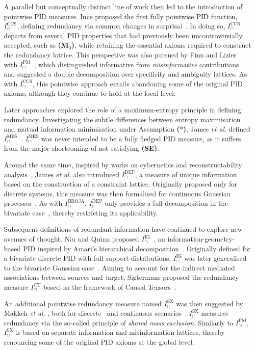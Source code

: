 \documentclass{article}
\makeatletter
\newcommand{\etal}{\textit{et al.\@} }
\newcommand{\ts}[1]{\ensuremath{_{\text{#1}}}}
\newcommand{\Mz}{\textbf{(M\ts{0})}\xspace} %
\newcommand{\AST}{\textbf{($\boldsymbol{\ast}$)}\xspace} %
\newcommand{\SE}{\textbf{(SE)}\xspace} %
\newcommand{\IBROJA}{\ensuremath{I_\cap^{\text{BROJA}}}\xspace}
\newcommand{\IPM}{\ensuremath{I_\cap^{\text{PM}}}\xspace}
\newcommand{\ICCS}{\ensuremath{I_\cap^{\text{CCS}}}\xspace}
\newcommand{\IDEP}{\ensuremath{I_\cap^{\text{DEP}}}\xspace}
\newcommand{\ICT}{\ensuremath{I_\cap^{\text{CT}}}\xspace}
\newcommand{\IMES}{\ensuremath{I_\cap^{\text{MES}}}\xspace}
\newcommand{\IIG}{\ensuremath{I_\cap^{\text{IG}}}\xspace}
\newcommand{\ISX}{\ensuremath{I_\cap^{\text{SX}}}\xspace}
\makeatother
\begin{document}
A parallel but conceptually distinct line of work then led to the introduction of pointwise PID measures. Ince proposed the first fully pointwise PID function, \ICCS, defining redundancy via common changes in surprisal~\cite{ince2017measuring}. In doing so, \ICCS departs from several PID properties that had previously been uncontroversially accepted, such as \Mz, while retaining the essential axioms required to construct the redundancy lattice. This perspective was also pursued by Finn and Lizier with \IPM~\cite{finn2018probability, finn2018pointwise}, which distinguished informative from \textit{misinformative} contributions and suggested a double decomposition over specificity and ambiguity lattices. As with \ICCS, this pointwise approach entails abandoning some of the original PID axioms, although they continue to hold at the local level.

Later approaches explored the role of a maximum-entropy principle in defining redundancy. Investigating the subtle differences between entropy maximisation and mutual information minimisation under Assumption \AST, James \etal defined \IMES~\cite{james2018uniquekey}. \IMES was never intended to be a fully fledged PID measure, as it suffers from the major shortcoming of not satisfying \SE.

Around the same time, inspired by works on cybernetics and reconstructability analysis~\cite{zwick2004overview, krippendorff2009ross}, James \etal also introduced \IDEP, a measure of unique information based on the construction of a constraint lattice. Originally proposed only for discrete systems, this measure was then formalised for continuous Gaussian processes~\cite{kay2018exact}. As with \IBROJA, \IDEP only provides a full decomposition in the bivariate case~\cite{james2018unique}, thereby restricting its applicability.

Subsequent definitions of redundant information have continued to explore new avenues of thought. Niu and Quinn proposed \IIG~\cite{niu2019measure}, an information-geometry-based PID inspired by Amari's hierarchical decomposition~\cite{amari2001information}. Originally defined for a bivariate discrete PID with full-support distributions, \IIG was later generalised to the bivariate Gaussian case~\cite{kay2024partial}. Aiming to account for the indirect mediated associations between sources and target, Sigtermans proposed the redundancy measure \ICT based on the framework of Causal Tensors~\cite{sigtermans2020towards, sigtermans2020partial}.

An additional pointwise redundancy measure named \ISX was then suggested by Makkeh \etal, both for discrete~\cite{makkeh2021introducing} and continuous scenarios~\cite{schick2021partial, ehrlich2024partial}. \ISX measures redundancy via the so-called principle of \textit{shared mass exclusion}. Similarly to \IPM, \ISX is based on separate information and misinformation lattices, thereby renouncing some of the original PID axioms at the global level. 
\end{document}
